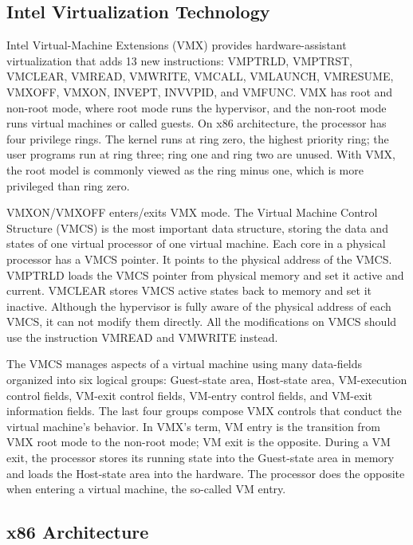 \subsection{Intel Virtualization Technology}

Intel Virtual-Machine Extensions (VMX) provides hardware-assistant virtualization that adds 13 new instructions: VMPTRLD, VMPTRST, VMCLEAR, VMREAD, VMWRITE, VMCALL, VMLAUNCH, VMRESUME, VMXOFF, VMXON, INVEPT, INVVPID, and VMFUNC. VMX has root and non-root mode, where root mode runs the hypervisor, and the non-root mode runs virtual machines or called guests. On x86 architecture, the processor has four privilege rings. The kernel runs at ring zero, the highest priority ring; the user programs run at ring three; ring one and ring two are unused. With VMX, the root model is commonly viewed as the ring minus one, which is more privileged than ring zero.

VMXON/VMXOFF enters/exits VMX mode. The Virtual Machine Control Structure (VMCS) is the most important data structure, storing the data and states of one virtual processor of one virtual machine. Each core in a physical processor has a VMCS pointer. It points to the physical address of the VMCS. VMPTRLD loads the VMCS pointer from physical memory and set it active and current. VMCLEAR stores VMCS active states back to memory and set it inactive. Although the hypervisor is fully aware of the physical address of each VMCS, it can not modify them directly. All the modifications on VMCS should use the instruction VMREAD and VMWRITE instead.

The VMCS manages aspects of a virtual machine using many data-fields organized into six logical groups: Guest-state area, Host-state area, VM-execution control fields, VM-exit control fields, VM-entry control fields, and VM-exit information fields. The last four groups compose VMX controls that conduct the virtual machine's behavior. In VMX's term, VM entry is the transition from VMX root mode to the non-root mode; VM exit is the opposite. During a VM exit, the processor stores its running state into the Guest-state area in memory and loads the Host-state area into the hardware. The processor does the opposite when entering a virtual machine, the so-called VM entry.



\subsection{x86 Architecture}


